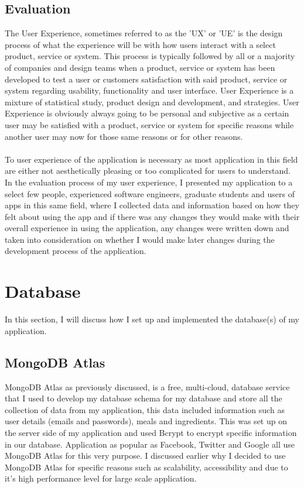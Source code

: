 \subsection{Evaluation}

The User Experience, sometimes referred to as the 'UX' or 'UE' is the design process of what the experience will be with how users interact with a select product, service or system. This process is typically followed by all or a majority of companies and design teams when a product, service or system has been developed to test a user or customers satisfaction with said product, service or system regarding usability, functionality and user interface. User Experience is a mixture of statistical study, product design and development, and strategies. User Experience is obviously always going to be personal and subjective as a certain user may be satisfied with a product, service or system for specific reasons while another user may now for those same reasons or for other reasons.\\ \\
To user experience of the application is necessary as most application in this field are either not aesthetically pleasing or too complicated for users to understand. In the evaluation process of my user experience, I presented my application to a select few people, experienced software engineers, graduate students and users of apps in this same field, where I collected data and information based on how they felt about using the app and if there was any changes they would make with their overall experience in using the application, any changes were written down and taken into consideration on whether I would make later changes during the development process of the application.

\section{Database}

In this section, I will discuss how I set up and implemented the database(s) of my application.

\subsection{MongoDB Atlas}

MongoDB Atlas as previously discussed, is a free, multi-cloud, database service that I used to develop my database schema for my database and store all the collection of data from my application, this data included information such as user details (emails and passwords), meals and ingredients. This was set up on the server side of my application and used Bcrypt to encrypt specific information in our database. Application as popular as Facebook, Twitter and Google all use MongoDB Atlas for this very purpose. I discussed earlier why I decided to use MongoDB Atlas for specific reasons such as scalability, accessibility and due to it's high performance level for large scale application.

